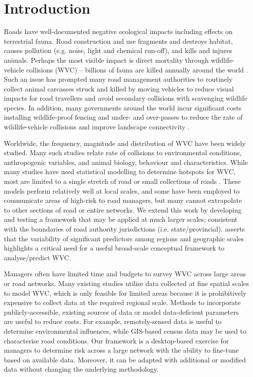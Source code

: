 \newpage
\section{Introduction}

Roads have well-documented negative ecological impacts \citep{form98,spel98,rvdr15} including effects on terrestrial fauna. Road construction and use fragments and destroys habitat, causes pollution (e.g. noise, light and chemical run-off), and kills and injures animals. Perhaps the most visible impact is direct mortality through wildlife-vehicle collisions (WVC) -- billions of fauna are killed annually around the world \citep{seil06}. Such an issue has prompted many road management authorities to routinely collect animal carcasses struck and killed by moving vehicles to reduce visual impacts for road travellers \citep{huij07b} and avoid secondary collisions with scavenging wildlife species. In addition, many governments around the world incur significant costs installing wildlife-proof fencing and under- and over-passes to reduce the rate of wildlife-vehicle collisions and improve landscape connectivity \citep{rvdr15}.

Worldwide, the frequency, magnitude and distribution of WVC have been widely studied. Many such studies relate rate of collisions to environmental conditions, anthropogenic variables, and animal biology, behaviour and characteristics. While many studies have used statistical modelling to determine hotspots for WVC, most are limited to a single stretch of road or small collections of roads \citep[e.g.][]{gund98,clev02,clev03,ramp05,ramp06b,gome08,lang09,hurl09,roge09,hoth12,mark12,sant13,seo15}. These models perform relatively well at local scales, and some have been employed to communicate areas of high-risk to road managers, but many cannot extrapolate to other sections of road or entire networks. We extend this work by developing and testing a framework that may be applied at much larger scales; consistent with the boundaries of road authority jurisdictions (i.e. state/provincial). \cite{clev15} asserts that the variability of significant predictors among regions and geographic scales highlights a critical need for a useful broad-scale conceptual framework to analyse/predict WVC.

Managers often have limited time and budgets to survey WVC across large areas or road networks. Many existing studies utilise data collected at fine spatial scales to model WVC, which is only feasible for limited areas because it is prohibitively expensive to collect data at the required regional scale. Methods to incorporate publicly-accessible, existing sources of data or model data-deficient parameters are useful to reduce costs. For example, remotely-sensed data is useful to determine environmental influences, while GIS-based census data may be used to characterise road conditions. Our framework is a desktop-based exercise for managers to determine risk across a large network with the ability to fine-tune based on available data. Moreover, it can be adapted with additional or modified data without changing the underlying methodology.

